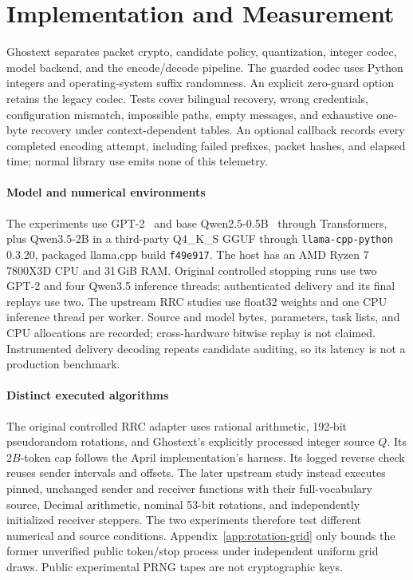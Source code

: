 \section{Implementation and Measurement}
\label{sec:implementation}

Ghostext separates packet crypto, candidate policy, quantization, integer codec,
model backend, and the encode/decode pipeline. The guarded codec uses Python
integers and operating-system suffix randomness. An explicit zero-guard option
retains the legacy codec. Tests cover bilingual recovery, wrong credentials,
configuration mismatch, impossible paths, empty messages, and exhaustive
one-byte recovery under context-dependent tables. An optional callback records
every completed encoding attempt, including failed prefixes, packet hashes,
and elapsed time; normal library use emits none of this telemetry.

\paragraph{Model and numerical environments}
The experiments use GPT-2~\cite{radford2019gpt2} and base
Qwen2.5-0.5B~\cite{qwen2024models} through Transformers, plus Qwen3.5-2B in a
third-party Q4\_K\_S GGUF through \texttt{llama-cpp-python} 0.3.20, packaged
llama.cpp build \texttt{f49e917}. The host has an AMD Ryzen 7 7800X3D CPU and
31\,GiB RAM. Original controlled stopping runs use two GPT-2 and four
Qwen3.5 inference threads; authenticated delivery and its final replays use
two. The upstream RRC studies use float32 weights and one CPU inference
thread per worker. Source and model bytes,
parameters, task lists, and CPU allocations are recorded; cross-hardware
bitwise replay is not claimed. Instrumented delivery decoding repeats candidate
auditing, so its latency is not a production benchmark.

\paragraph{Distinct executed algorithms}
The original controlled RRC adapter uses rational arithmetic, 192-bit
pseudorandom rotations, and Ghostext's explicitly processed integer source
$Q$. Its $2B$-token cap follows the April implementation's harness. Its logged
reverse check reuses sender intervals and offsets. The later upstream study
instead executes pinned, unchanged sender and receiver functions with their
full-vocabulary source, Decimal arithmetic, nominal 53-bit rotations, and
independently initialized receiver steppers. The two experiments therefore
test different numerical and source conditions. Appendix~\ref{app:rotation-grid}
only bounds the former unverified public token/stop process under independent
uniform grid draws. Public experimental PRNG tapes are not cryptographic keys.

